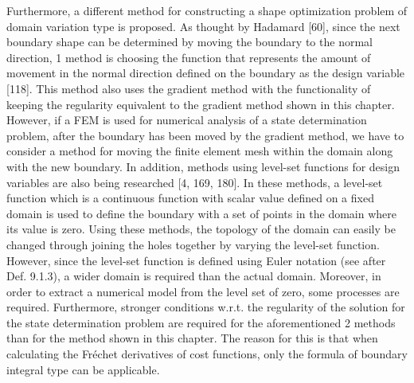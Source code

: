 \documentclass[oneside]{book}
\numberwithin{equation}{section}
\begin{document}
Furthermore, a different method for constructing a shape optimization problem of domain variation type is proposed. As thought by Hadamard [60], since the next boundary shape can be determined by moving the boundary to the normal direction, 1 method is choosing the function that represents the amount of movement in the normal direction defined on the boundary as the design variable [118]. This method also uses the gradient method with the functionality of keeping the regularity equivalent to the gradient method shown in this chapter. However, if a FEM is used for numerical analysis of a state determination problem, after the boundary has been moved by the gradient method, we have to consider a method for moving the finite element mesh within the domain along with the new boundary. In addition, methods using level-set functions for design variables are also being researched [4, 169, 180]. In these methods, a level-set function which is a continuous function with scalar value defined on a fixed domain is used to define the boundary with a set of points in the domain where its value is zero. Using these methods, the topology of the domain can easily be changed through joining the holes together by varying the level-set function. However, since the level-set function is defined using Euler notation (see after Def. 9.1.3), a wider domain is required than the actual domain. Moreover, in order to extract a numerical model from the level set of zero, some processes are required. Furthermore, stronger conditions w.r.t. the regularity of the solution for the state determination problem are required for the aforementioned 2 methods than for the method shown in this chapter. The reason for this is that when calculating the Fr\'echet derivatives of cost functions, only the formula of boundary integral type can be applicable.
\end{document}
